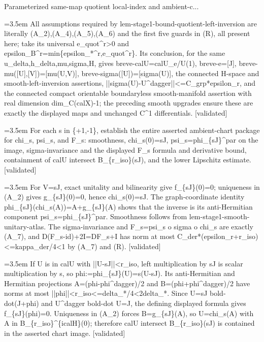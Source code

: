 \documentclass{article}
\newcommand{\step}[1]{\par\noindent\hangindent=3.5em\hangafter=1%
  \makebox[3.5em][l]{\textbf{#1.}}}
\newcommand{\steptag}[1]{\hfill{\small\textsf{[#1]}}}
\begin{document}
\begin{proofbox}{Parameterized same-map quotient local-index and ambient-c...}
\step{1.1.2} All assumptions required by lem-stage1-bound-quotient-left-inversion are literally (A\_2),(A\_4),(A\_5),(A\_6) and the first five guards in (R), all present here; take its universal e\_quot\textasciicircum{}r>0 and epsilon\_B\textasciicircum{}r=min\{epsilon\_*\textasciicircum{}r,e\_quot\textasciicircum{}r\}. Its conclusion, for the same u\_delta,h\_delta,mu,sigma,H, gives breve-calU=calU\_e/U(1), breve-e=[J], breve-mu([U],[V])=[mu(U,V)], breve-sigma([U])=[sigma(U)], the connected H-space and smooth-left-inversion assertions, ||sigma(U)-U\textasciicircum{}dagger||<=C\_grp*epsilon\_r, and the connected compact orientable boundaryless smooth-manifold assertion with real dimension dim\_C(calX)-1; the preceding smooth upgrades ensure these are exactly the displayed maps and unchanged C\textasciicircum{}1 differentials. \steptag{validated} \\[4pt]
\step{1.2} For each s in \{+1,-1\}, establish the entire asserted ambient-chart package for chi\_s, psi\_s, and F\_s: smoothness, chi\_s(0)=sJ, psi\_s=phi\_\{sJ\}\textasciicircum{}par on the image, sigma-invariance and the displayed F\_s formula and derivative bound, containment of calU intersect B\_\{r\_iso\}(sJ), and the lower Lipschitz estimate. \steptag{validated} \\[6pt]
\step{1.2.1} For V=sJ, exact unitality and bilinearity give f\_\{sJ\}(0)=0; uniqueness in (A\_2) gives g\_\{sJ\}(0)=0, hence chi\_s(0)=sJ. The graph-coordinate identity phi\_\{sJ\}(chi\_s(A))=A+g\_\{sJ\}(A) shows that the inverse is its anti-Hermitian component psi\_s=phi\_\{sJ\}\textasciicircum{}par. Smoothness follows from lem-stage1-smooth-unitary-atlas. The sigma-invariance and F\_s=psi\_s o sigma o chi\_s are exactly (A\_7), and D(F\_s-id)+2I=DF\_s+I has norm at most C\_der*(epsilon\_r+r\_iso)<=kappa\_der/4<1 by (A\_7) and (R). \steptag{validated} \\[4pt]
\step{1.2.2} If U is in calU with ||U-sJ||<r\_iso, left multiplication by sJ is scalar multiplication by s, so phi:=phi\_\{sJ\}(U)=s(U-sJ). Its anti-Hermitian and Hermitian projections A=(phi-phi\textasciicircum{}dagger)/2 and B=(phi+phi\textasciicircum{}dagger)/2 have norms at most ||phi||<r\_iso<=delta\_*/4<2delta\_*. Since U=sJ bold-dot(J+phi) and U\textasciicircum{}dagger bold-dot U=J, the defining displayed formula gives f\_\{sJ\}(phi)=0. Uniqueness in (A\_2) forces B=g\_\{sJ\}(A), so U=chi\_s(A) with A in B\_\{r\_iso\}\textasciicircum{}\{icalH\}(0); therefore calU intersect B\_\{r\_iso\}(sJ) is contained in the asserted chart image. \steptag{validated} \\[4pt]

\end{proofbox}
\end{document}
